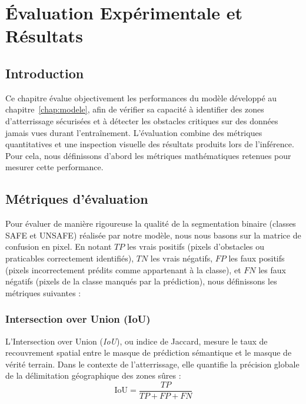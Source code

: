 \chapter{Évaluation Expérimentale et Résultats}
\label{chap:evaluation}

\section{Introduction}

Ce chapitre évalue objectivement les performances du modèle développé au chapitre~\ref{chap:modele}, afin de vérifier sa capacité à identifier des zones d'atterrissage sécurisées et à détecter les obstacles critiques sur des données jamais vues durant l'entraînement. L'évaluation combine des métriques quantitatives et une inspection visuelle des résultats produits lors de l'inférence. Pour cela, nous définissons d'abord les métriques mathématiques retenues pour mesurer cette performance.

\section{Métriques d'évaluation}
\label{sec:metriques}

Pour évaluer de manière rigoureuse la qualité de la segmentation binaire (classes SAFE et UNSAFE) réalisée par notre modèle, nous nous basons sur la matrice de confusion en pixel. En notant $TP$ les vrais positifs (pixels d'obstacles ou praticables correctement identifiés), $TN$ les vrais négatifs, $FP$ les faux positifs (pixels incorrectement prédits comme appartenant à la classe), et $FN$ les faux négatifs (pixels de la classe manqués par la prédiction), nous définissons les métriques suivantes :

\subsection{Intersection over Union (IoU)}
L'Intersection over Union (\textit{IoU}), ou indice de Jaccard, mesure le taux de recouvrement spatial entre le masque de prédiction sémantique et le masque de vérité terrain. Dans le contexte de l'atterrissage, elle quantifie la précision globale de la délimitation géographique des zones sûres :
\begin{equation}
  \text{IoU} = \frac{TP}{TP + FP + FN}
\end{equation}

